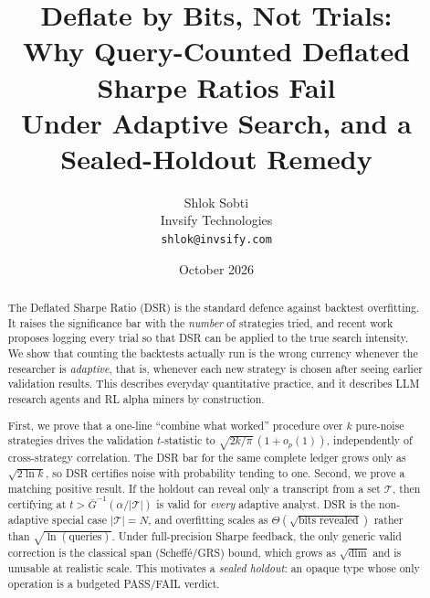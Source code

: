 \documentclass[11pt]{article}
\title{Deflate by Bits, Not Trials:\\Why Query-Counted Deflated Sharpe Ratios Fail\\Under Adaptive Search, and a Sealed-Holdout Remedy}
\author{Shlok Sobti\\Invsify Technologies\\\texttt{shlok@invsify.com}}
\date{October 2026}
\theoremstyle{definition}
\theoremstyle{remark}
\newcommand{\cT}{\mathcal{T}}
\begin{document}
\maketitle

\begin{abstract}
The Deflated Sharpe Ratio (DSR) is the standard defence against backtest overfitting. It raises the significance bar with the \emph{number} of strategies tried, and recent work proposes logging every trial so that DSR can be applied to the true search intensity. We show that counting the backtests actually run is the wrong currency whenever the researcher is \emph{adaptive}, that is, whenever each new strategy is chosen after seeing earlier validation results. This describes everyday quantitative practice, and it describes LLM research agents and RL alpha miners by construction.

First, we prove that a one-line ``combine what worked'' procedure over $k$ pure-noise strategies drives the validation $t$-statistic to $\sqrt{2k/\pi}\,(1+o_p(1))$, independently of cross-strategy correlation. The DSR bar for the same complete ledger grows only as $\sqrt{2\ln k}$, so DSR certifies noise with probability tending to one. Second, we prove a matching positive result. If the holdout can reveal only a transcript from a set $\cT$, then certifying at $t>\bar G^{-1}(\alpha/|\cT|)$ is valid for \emph{every} adaptive analyst. DSR is the non-adaptive special case $|\cT|=N$, and overfitting scales as $\Theta(\sqrt{\text{bits revealed}})$ rather than $\sqrt{\ln(\text{queries})}$. Under full-precision Sharpe feedback, the only generic valid correction is the classical span (Scheff\'e/GRS) bound, which grows as $\sqrt{\dim}$ and is unusable at realistic scale. This motivates a \emph{sealed holdout}: an opaque type whose only operation is a budgeted PASS/FAIL verdict.


\end{abstract}
\end{document}
